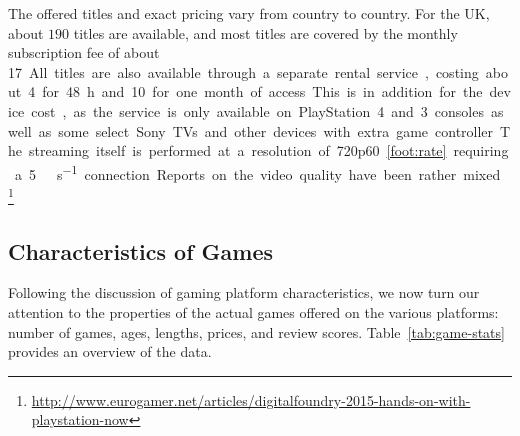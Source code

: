 The offered titles and exact pricing vary from country to country. For the UK, about $190$ titles are available, and most titles are covered by the monthly subscription fee of about \SI{17}[\EUR]. All titles are also available through a separate rental service, costing about \SI{4}[\EUR] for \SI{48}{\hour} and \SI{10}[\EUR] for one month of access. This is in addition for the device cost, as the service is only available on  PlayStation 4 and 3 consoles as well as some select Sony TVs and other devices with extra game controller.


The streaming itself is performed at a resolution of 720p60\cref{foot:rate} requiring a \SI{5}{\mega\bit\per\second} connection. Reports on the video quality have been rather mixed.\footnote{\url{http://www.eurogamer.net/articles/digitalfoundry-2015-hands-on-with-playstation-now}} %





\subsection{Characteristics of Games}

Following the discussion of gaming platform characteristics, we now turn our attention to the properties of the actual games offered on the various platforms: number of games, ages, lengths, prices, and review scores. Table~\ref{tab:game-stats} provides an overview of the data.

